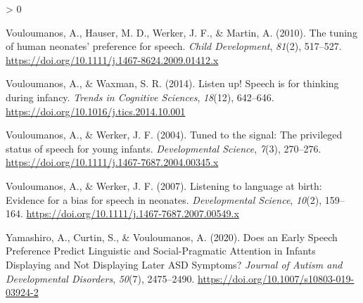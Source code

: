 \documentclass[
  english,
  man]{apa6}
\newlength{\cslhangindent}
\newenvironment{CSLReferences}[2] %
 {%
  \setlength{\parindent}{0pt}
  \ifodd #1 \everypar{\setlength{\hangindent}{\cslhangindent}}\ignorespaces\fi
  \ifnum #2 > 0
  \setlength{\parskip}{#2\baselineskip}
  \fi
 }%
 {}
\begin{document}
\begin{CSLReferences}{1}{0}
\leavevmode\hypertarget{ref-vouloumanos_tuning_2010}{}%
Vouloumanos, A., Hauser, M. D., Werker, J. F., \& Martin, A. (2010). The tuning of human neonates' preference for speech. \emph{Child Development}, \emph{81}(2), 517--527. \url{https://doi.org/10.1111/j.1467-8624.2009.01412.x}

\leavevmode\hypertarget{ref-vouloumanos_listen_2014}{}%
Vouloumanos, A., \& Waxman, S. R. (2014). Listen up! {Speech} is for thinking during infancy. \emph{Trends in Cognitive Sciences}, \emph{18}(12), 642--646. \url{https://doi.org/10.1016/j.tics.2014.10.001}

\leavevmode\hypertarget{ref-vouloumanos_tuned_2004}{}%
Vouloumanos, A., \& Werker, J. F. (2004). Tuned to the signal: The privileged status of speech for young infants. \emph{Developmental Science}, \emph{7}(3), 270--276. \url{https://doi.org/10.1111/j.1467-7687.2004.00345.x}

\leavevmode\hypertarget{ref-vouloumanos_listening_2007}{}%
Vouloumanos, A., \& Werker, J. F. (2007). Listening to language at birth: Evidence for a bias for speech in neonates. \emph{Developmental Science}, \emph{10}(2), 159--164. \url{https://doi.org/10.1111/j.1467-7687.2007.00549.x}

\leavevmode\hypertarget{ref-yamashiro_does_2020}{}%
Yamashiro, A., Curtin, S., \& Vouloumanos, A. (2020). Does an {Early} {Speech} {Preference} {Predict} {Linguistic} and {Social}-{Pragmatic} {Attention} in {Infants} {Displaying} and {Not} {Displaying} {Later} {ASD} {Symptoms}? \emph{Journal of Autism and Developmental Disorders}, \emph{50}(7), 2475--2490. \url{https://doi.org/10.1007/s10803-019-03924-2}

\end{CSLReferences}

\endgroup
\end{document}
